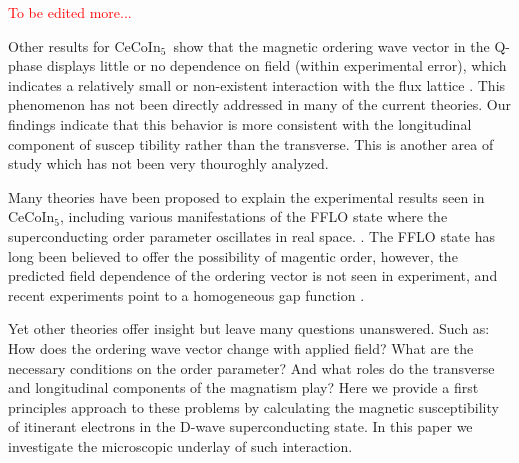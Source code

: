 \documentclass[prb,showpacs,amssymb,amsmath,twocolumn]{revtex4-1}
\newcommand{\red}{\textcolor{red}}
\newcommand{\cecoin}{CeCoIn$_5$}
\begin{document}
\red{To be edited more...} 

Other results for \cecoin\ show that the magnetic ordering wave vector in the
Q-phase displays little or no dependence on field (within experimental error),
which indicates a relatively small or non-existent interaction with the flux
lattice \cite{cecoin5_Kenzelmann2}. This phenomenon has not been directly
addressed in many of the current theories. Our findings indicate that this
behavior is more consistent with the longitudinal component of suscep	tibility
rather than the transverse. This is another area of study which has not been
very thouroghly analyzed.

Many theories have been proposed to explain the experimental results seen in
\cecoin, including various manifestations of the FFLO state where the
superconducting order parameter oscillates in real space.
\cite{sc_sdw_anton,mag_afm_fflo_sigrist,fflo_pen_depth,sc_afm_kato,sc_afm_ikeda,sdw_vortex}.
The FFLO state has long been believed to offer the possibility of magentic
order, however, the predicted field dependence of the ordering vector is not
seen in experiment, and recent experiments point to a homogeneous gap function
\cite{cecoin5_Kenzelmann2,cooperPairsCeCoIn5}.

Yet other theories offer insight but leave many questions unanswered. Such as:
How does the ordering wave vector change with applied field? What are the
necessary conditions on the order parameter? And what roles do the transverse
and longitudinal components of the magnatism play? Here we provide a first
principles approach to these problems by calculating the magnetic
susceptibility of itinerant electrons in the D-wave superconducting state. 
In this paper we investigate the microscopic underlay of such interaction. 





\end{document}
